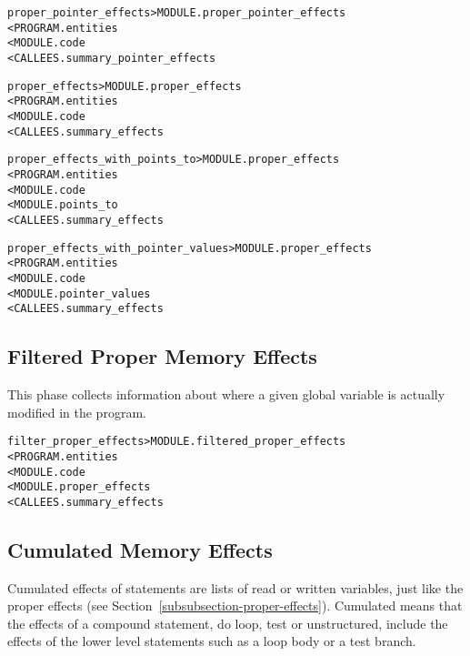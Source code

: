 \documentclass[a4paper]{report}
\newenvironment{PipsMake}{\begin{alltt}}{\end{alltt}}
\newenvironment{PipsPass}[1]{\label{pass:#1}}{}
\begin{document}
\begin{PipsMake}
proper_pointer_effects                  > MODULE.proper_pointer_effects
        < PROGRAM.entities
        < MODULE.code
        < CALLEES.summary_pointer_effects
\end{PipsMake}

\begin{PipsMake}
proper_effects                  > MODULE.proper_effects
        < PROGRAM.entities
        < MODULE.code
        < CALLEES.summary_effects
\end{PipsMake}

\begin{PipsMake}
proper_effects_with_points_to > MODULE.proper_effects
        < PROGRAM.entities
        < MODULE.code
        < MODULE.points_to
        < CALLEES.summary_effects
\end{PipsMake}

\begin{PipsMake}
proper_effects_with_pointer_values > MODULE.proper_effects
        < PROGRAM.entities
        < MODULE.code
        < MODULE.pointer_values
        < CALLEES.summary_effects
\end{PipsMake}


\subsection{Filtered Proper Memory Effects}
\label{subsubsection-filtered-proper-effects}

\begin{PipsPass}{filter_proper_effects}
This phase collects information about where a given global variable is
actually modified in the program.
\end{PipsPass}


\begin{PipsMake}
filter_proper_effects         > MODULE.filtered_proper_effects
        < PROGRAM.entities
        < MODULE.code
        < MODULE.proper_effects
        < CALLEES.summary_effects
\end{PipsMake}


\subsection{Cumulated Memory Effects}
\label{subsubsection-cumulated-effects}

\begin{PipsPass}{cumulated_effects}
Cumulated effects of statements are lists of read or written
variables, just like the proper effects (see Section~\ref{subsubsection-proper-effects}). Cumulated means that the effects of a compound statement, do
loop, test or unstructured, include the effects of the lower level
statements such as a loop body or a test branch.
\end{PipsPass}
\end{document}
